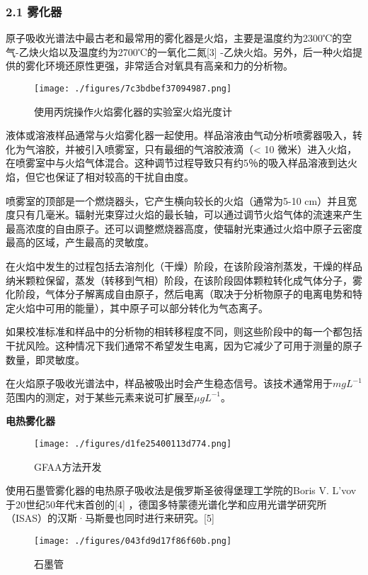 \subsubsection{2.1 雾化器}

原子吸收光谱法中最古老和最常用的雾化器是火焰，主要是温度约为2300℃的空气-乙炔火焰以及温度约为2700℃的一氧化二氮[3] -乙炔火焰。另外，后一种火焰提供的雾化环境还原性更强，非常适合对氧具有高亲和力的分析物。

\begin{figure}[ht]
\centering
\texttt{[image: ./figures/7c3bdbef37094987.png]}
\caption{使用丙烷操作火焰雾化器的实验室火焰光度计} \label{fig_AAS_3}
\end{figure}

液体或溶液样品通常与火焰雾化器一起使用。样品溶液由气动分析喷雾器吸入，转化为气溶胶，并被引入喷雾室，只有最细的气溶胶液滴（< 10 微米）进入火焰，在喷雾室中与火焰气体混合。这种调节过程导致只有约5％的吸入样品溶液到达火焰，但它也保证了相对较高的干扰自由度。

喷雾室的顶部是一个燃烧器头，它产生横向较长的火焰（通常为5-10 cm）并且宽度只有几毫米。辐射光束穿过火焰的最长轴，可以通过调节火焰气体的流速来产生最高浓度的自由原子。还可以调整燃烧器高度，使辐射光束通过火焰中原子云密度最高的区域，产生最高的灵敏度。

在火焰中发生的过程包括去溶剂化（干燥）阶段，在该阶段溶剂蒸发，干燥的样品纳米颗粒保留，蒸发（转移到气相）阶段，在该阶段固体颗粒转化成气体分子，雾化阶段，气体分子解离成自由原子，然后电离（取决于分析物原子的电离电势和特定火焰中可用的能量），其中原子可以部分转化为气态离子。

如果校准标准和样品中的分析物的相转移程度不同，则这些阶段中的每一个都包括干扰风险。这种情况下我们通常不希望发生电离，因为它减少了可用于测量的原子数量，即灵敏度。

在火焰原子吸收光谱法中，样品被吸出时会产生稳态信号。该技术通常用于$mg L^{-1}$ 范围内的测定，对于某些元素来说可扩展至$\mu g L^{-1}$。

\textbf{电热雾化器}

\begin{figure}[ht]
\centering
\texttt{[image: ./figures/d1fe25400113d774.png]}
\caption{GFAA方法开发} \label{fig_AAS_4}
\end{figure}

使用石墨管雾化器的电热原子吸收法是俄罗斯圣彼得堡理工学院的Boris V. L’vov于20世纪50年代末首创的[4] ，德国多特蒙德光谱化学和应用光谱学研究所（ISAS）的汉斯·马斯曼也同时进行来研究。[5]

\begin{figure}[ht]
\centering
\texttt{[image: ./figures/043fd9d17f86f60b.png]}
\caption{石墨管} \label{fig_AAS_5}
\end{figure}

